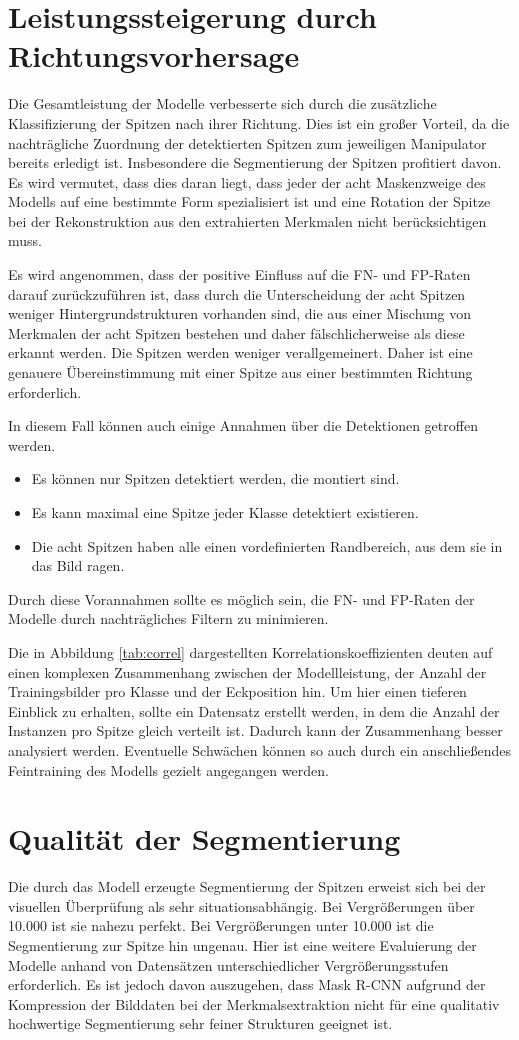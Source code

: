 \section{Leistungssteigerung durch Richtungsvorhersage}
Die Gesamtleistung der Modelle verbesserte sich durch die zusätzliche Klassifizierung der Spitzen nach ihrer Richtung. Dies ist ein großer Vorteil, da die nachträgliche Zuordnung der detektierten Spitzen zum jeweiligen Manipulator bereits erledigt ist. Insbesondere die Segmentierung der Spitzen profitiert davon. Es wird vermutet, dass dies daran liegt, dass jeder der acht Maskenzweige des Modells auf eine bestimmte Form spezialisiert ist und eine Rotation der Spitze bei der Rekonstruktion aus den extrahierten Merkmalen nicht berücksichtigen muss.

Es wird angenommen, dass der positive Einfluss auf die FN- und FP-Raten darauf zurückzuführen ist, dass durch die Unterscheidung der acht Spitzen weniger Hintergrundstrukturen vorhanden sind, die aus einer Mischung von Merkmalen der acht Spitzen bestehen und daher fälschlicherweise als diese erkannt werden. Die Spitzen werden weniger verallgemeinert. Daher ist eine genauere Übereinstimmung mit einer Spitze aus einer bestimmten Richtung erforderlich.

In diesem Fall können auch einige Annahmen über die Detektionen getroffen werden.
\begin{itemize}
    \item Es können nur Spitzen detektiert werden, die montiert sind.
    \item Es kann maximal eine Spitze jeder Klasse detektiert existieren.
    \item Die acht Spitzen haben alle einen vordefinierten Randbereich, aus dem sie in das Bild ragen. 
\end{itemize}
Durch diese Vorannahmen sollte es möglich sein, die FN- und FP-Raten der Modelle durch nachträgliches Filtern zu minimieren.

Die in Abbildung \ref{tab:correl} dargestellten Korrelationskoeffizienten deuten auf einen komplexen Zusammenhang zwischen der Modellleistung, der Anzahl der Trainingsbilder pro Klasse und der Eckposition hin.
Um hier einen tieferen Einblick zu erhalten, sollte ein Datensatz erstellt werden, in dem die Anzahl der Instanzen pro Spitze gleich verteilt ist. Dadurch kann der Zusammenhang besser analysiert werden. Eventuelle Schwächen können so auch durch ein anschließendes Feintraining des Modells gezielt angegangen werden.
\section{Qualität der Segmentierung}
Die durch das Modell erzeugte Segmentierung der Spitzen erweist sich bei der visuellen Überprüfung als sehr situationsabhängig. Bei Vergrößerungen über 10.000 ist sie nahezu perfekt. Bei Vergrößerungen unter 10.000 ist die Segmentierung zur Spitze hin ungenau. Hier ist eine weitere Evaluierung der Modelle anhand von Datensätzen unterschiedlicher Vergrößerungsstufen erforderlich. Es ist jedoch davon auszugehen, dass Mask R-CNN aufgrund der Kompression der Bilddaten bei der Merkmalsextraktion nicht für eine qualitativ hochwertige Segmentierung sehr feiner Strukturen geeignet ist.

